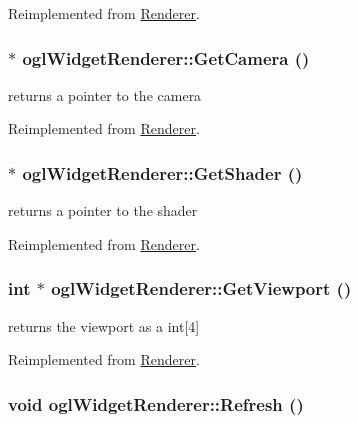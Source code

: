 Reimplemented from \hyperlink{class_renderer_d08d100b0c4d2f57417a06ceaaa2ba4e}{Renderer}.\hypertarget{classogl_widget_renderer_3c01888abac427988413194909e3e036}{
\subsubsection[{GetCamera}]{ $\ast$ oglWidgetRenderer::GetCamera ()}}
\label{classogl_widget_renderer_3c01888abac427988413194909e3e036}


returns a pointer to the camera 

Reimplemented from \hyperlink{class_renderer_527858930942368379414c1be75b5738}{Renderer}.\hypertarget{classogl_widget_renderer_43b18c582c133e5fab2c8ce7e3c68033}{
\subsubsection[{GetShader}]{ $\ast$ oglWidgetRenderer::GetShader ()}}
\label{classogl_widget_renderer_43b18c582c133e5fab2c8ce7e3c68033}


returns a pointer to the shader 

Reimplemented from \hyperlink{class_renderer_85ce8b768250bd767b019f8283a9d46b}{Renderer}.\hypertarget{classogl_widget_renderer_64dc363e1e2cc2393ff8ec635b77bd99}{
\subsubsection[{GetViewport}]{\setlength{\rightskip}{0pt plus 5cm}int $\ast$ oglWidgetRenderer::GetViewport ()}}
\label{classogl_widget_renderer_64dc363e1e2cc2393ff8ec635b77bd99}


returns the viewport as a int\mbox{[}4\mbox{]} 

Reimplemented from \hyperlink{class_renderer_9a93f4e3bad254923c0dc2810e658dd6}{Renderer}.\hypertarget{classogl_widget_renderer_098ec7e24496346f9978e6ce03b079ed}{
\subsubsection[{Refresh}]{\setlength{\rightskip}{0pt plus 5cm}void oglWidgetRenderer::Refresh ()}}
\label{classogl_widget_renderer_098ec7e24496346f9978e6ce03b079ed}


